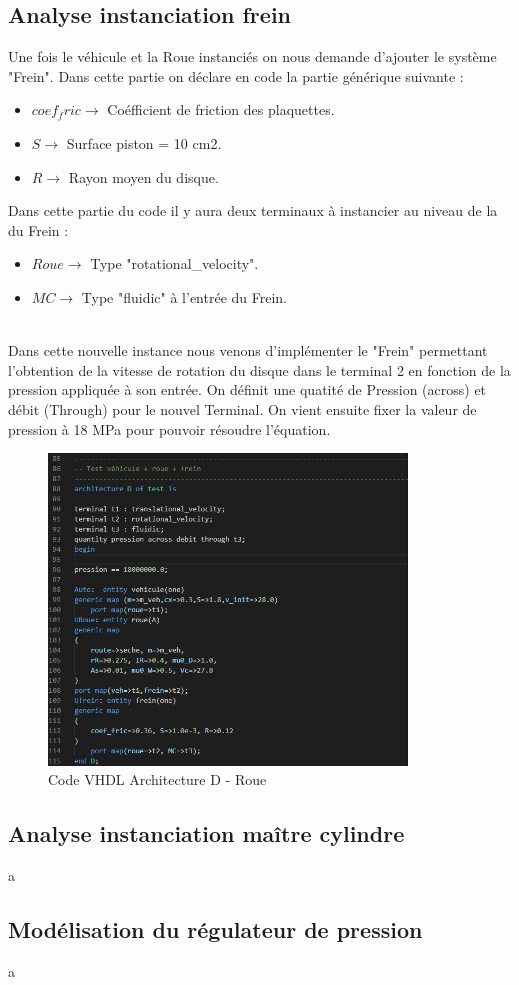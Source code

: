 \subsection{Analyse instanciation frein}
Une fois le véhicule et la Roue instanciés on nous demande d'ajouter le système "Frein". Dans cette partie on déclare en code la partie générique suivante :\\
\begin{itemize}
    \item $coef_fric    \rightarrow$ Coéfficient de friction des plaquettes.
    \item $S    \rightarrow$ Surface piston = 10 cm2.
    \item $R   \rightarrow$ Rayon moyen du disque.
\end{itemize}

Dans cette partie du code il y aura deux terminaux à instancier au niveau de la du Frein :\\

\begin{itemize}
    \item $Roue    \rightarrow$ Type "rotational\_velocity".
    \item $MC    \rightarrow$ Type "fluidic" à l'entrée du Frein.
\end{itemize}\\

Dans cette nouvelle instance nous venons d'implémenter le "Frein" permettant l'obtention de la vitesse de rotation du disque dans le terminal 2 en fonction de la pression appliquée à son entrée. On définit une quatité de Pression (across) et débit (Through) pour le nouvel Terminal. On vient ensuite fixer la valeur de pression à 18 MPa pour pouvoir résoudre l'équation.

\newpage

\begin{figure}[h]
    \centering
    \includegraphics[width=0.85\textwidth]{images/Instanciation_frein.jpg}
    \caption{Code VHDL Architecture D - Roue}
\end{figure}


\newpage

\subsection{Analyse instanciation maître cylindre}
a
\subsection{Modélisation du régulateur de pression}
a
\newpage